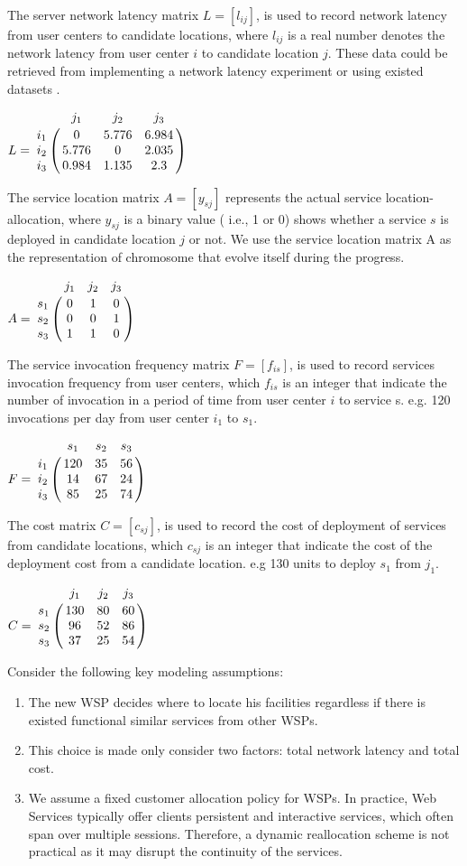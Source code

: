 \documentclass{llncs}
\let\bbordermatrix\bordermatrix
\begin{document}
The server network latency matrix $L = [l_{ij}]$, is used to record network latency from user centers to 
candidate locations, where $l_{ij}$ is a real number denotes the network latency from user center $i$ to candidate 
location $j$. 
These data could be retrieved from implementing a network latency experiment or using existed datasets \cite{5552800} \cite{6076756}.
\begin{center}
$
L = \bbordermatrix{~ & j_{1} & j_{2} & j_{3} \cr
					i_{1}	&0 &5.776 &6.984	\cr
					i_{2}	&5.776  &0 &2.035 \cr
					i_{3}	&0.984 &1.135	&2.3 \cr} 
$
\end{center}
The service location matrix $A = [y_{sj}]$ represents the actual service location-allocation, where $y_{sj}$  is a binary value ( i.e., 1 or 0) shows whether a service $s$ is deployed in candidate location $j$ or not.
We use the service location matrix A as the representation of chromosome that evolve itself during the progress.
\begin{center}
$
A = \bbordermatrix{~ & j_{1} & j_{2} & j_{3}\cr
					s_{1}	&0 &1 &0	\cr
					s_{2}	&0  &0 &1	\cr
					s_{3}	&1 &1 &0	\cr} 
$
\end{center}

The service invocation frequency matrix $F= [f_{is}]$, is used to record services invocation frequency from user centers, which $f_{is}$ is an integer that indicate the number of invocation in a period of time from user center $i$ to service s. e.g. 120 invocations per day from user center $i_{1}$ to $s_{1}$.
\begin{center}
$
F = \bbordermatrix{~ & s_{1} & s_{2} & s_{3}  \cr
					i_{1}	&120 &35 &56	\cr
					i_{2}	&14  &67 &24 \cr
					i_{3}	&85 &25 &74 \cr} 
$
\end{center}

The cost matrix $C = [c_{sj}]$, is used to record the cost of deployment of services from candidate locations, 
which $c_{sj}$ is an integer that indicate the cost of the deployment cost from a candidate location. 
e.g 130 units to deploy $s_{1}$ from $j_{1}$.
\begin{center}
$
C = \bbordermatrix{~ & j_{1} & j_{2} & j_{3}\cr
					s_{1}	&130 &80 &60\cr
					s_{2}	&96  &52 &86\cr
					s_{3}	&37 &25 &54\cr} 
$
\end{center}

Consider the following key modeling assumptions:
\begin{enumerate}
	\item The new WSP decides where to locate his facilities regardless if there is existed functional similar services from other WSPs.
	\item This choice is made only consider two factors: total network latency and total cost.
	\item We assume a fixed customer allocation policy for WSPs. In practice, Web Services typically offer clients persistent and interactive services, which often span over multiple sessions. Therefore, a dynamic reallocation scheme is not practical as it may disrupt the continuity of the services.
\end{enumerate}
\end{document}
